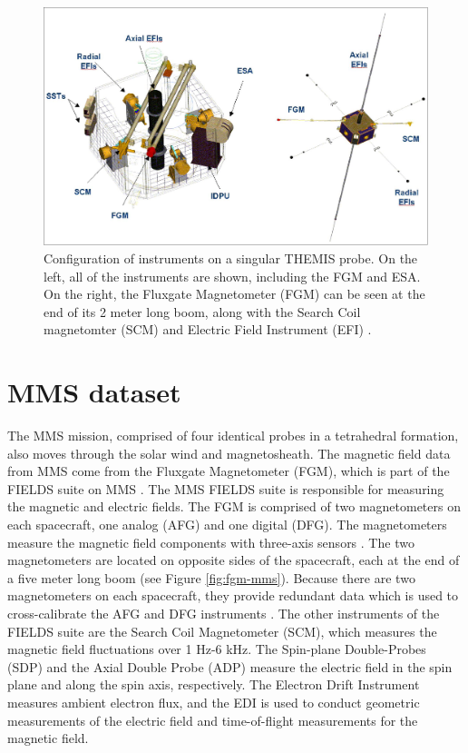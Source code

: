 \begin{figure}
    \centering
    \includegraphics[width=\textwidth]{Figures/Instrumentation/THM_diagram.jpeg}
    \caption[Configuration of instruments on a singular THEMIS probe]{Configuration of instruments on a singular THEMIS probe. On the left, all of the instruments are shown, including the FGM and ESA. On the right, the Fluxgate Magnetometer (FGM) can be seen at the end of its 2 meter long boom, along with the Search Coil magnetomter (SCM) and Electric Field Instrument (EFI) \citep{eoPortal}.}
    \label{fig:thm-diagram}
\end{figure}

\section{MMS dataset}
The MMS mission, comprised of four identical probes in a tetrahedral formation, also moves through the solar wind and magnetosheath. The magnetic field data from MMS come from the Fluxgate Magnetometer (FGM), which is part of the FIELDS suite on MMS \citep{Torbert:2016}. The MMS FIELDS suite is responsible for measuring the magnetic and electric fields. The FGM is comprised of two magnetometers on each spacecraft, one analog (AFG) and one digital (DFG). The magnetometers measure the magnetic field components with three-axis sensors \citep{Torbert:2016}. The two magnetometers are located on opposite sides of the spacecraft, each at the end of a five meter long boom (see Figure \ref{fig:fgm-mms}). Because there are two magnetometers on each spacecraft, they provide redundant data which is used to cross-calibrate the AFG and DFG instruments \citep{Torbert:2016}. The other instruments of the FIELDS suite are the Search Coil Magnetometer (SCM), which measures the magnetic field fluctuations over 1 Hz-6 kHz. The Spin-plane Double-Probes (SDP) and the Axial Double Probe (ADP) measure the electric field in the spin plane and along the spin axis, respectively. The Electron Drift Instrument measures ambient electron flux, and the EDI is used to conduct geometric measurements of the electric field and time-of-flight measurements for the magnetic field.

